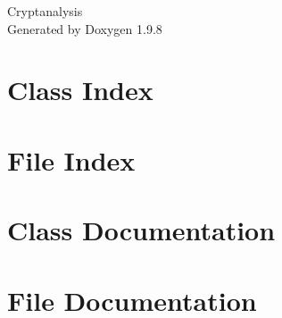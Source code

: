\documentclass[twoside]{book}
\newcommand{\+}{\discretionary{\mbox{\scriptsize$\hookleftarrow$}}{}{}}
\newcommand{\clearemptydoublepage}{%
    \newpage{\pagestyle{empty}\cleardoublepage}%
  }
\begin{document}
  \raggedbottom
    \hypersetup{pageanchor=false,
                bookmarksnumbered=true,
                pdfencoding=unicode
               }
  \begin{titlepage}
  \vspace*{7cm}
  \begin{center}%
  {\Large Cryptanalysis}\\
  \vspace*{1cm}
  {\large Generated by Doxygen 1.9.8}\\
  \end{center}
  \end{titlepage}
  \clearemptydoublepage
  \tableofcontents
  \clearemptydoublepage
  \hypersetup{pageanchor=true}
\chapter{Class Index}

\chapter{File Index}

\chapter{Class Documentation}


\chapter{File Documentation}




  \backmatter
  \newpage
  \clearemptydoublepage
  \printindex
\end{document}

